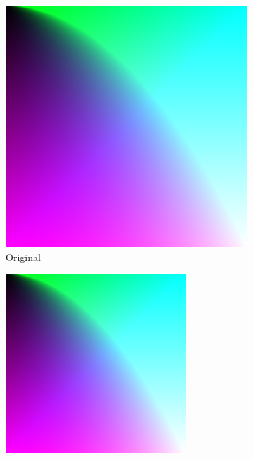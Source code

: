 \documentclass{article}
\begin{document}
\begin{figure}[ht]
  \centering
  \begin{subfigure}{0.23\textwidth}
    \centering
    \includegraphics[width=\textwidth]{notc1/notc1.png}
    \caption{Original}
  \end{subfigure}%
  \hfill
  \begin{subfigure}{0.23\textwidth}
    \centering
    \includegraphics[width=\textwidth]{notc1/compressed.png}

\end{subfigure}
\end{figure}
\end{document}
